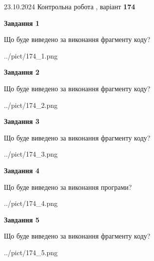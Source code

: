\documentclass[12pt, ukrainian]{article}
\begin{document}
{\Large{23.10.2024 Контрольна робота , варіант  \No \textbf { 174 }\par}}
{
\begin {large}
{\begin {center}\textbf{Завдання 1}\end {center}}

Що буде виведено за виконання фрагменту коду?\par
\begin{center}
	{../pict/174_1.png}
\end{center}
\newpage

{\begin {center}\textbf{Завдання 2}\end {center}}

Що буде виведено за виконання фрагменту коду?\par
\begin{center}
	{../pict/174_2.png}
\end{center}
\newpage

{\begin {center}\textbf{Завдання 3}\end {center}}

Що буде виведено за виконання фрагменту коду?\par
\begin{center}
	{../pict/174_3.png}
\end{center}
\newpage

{\begin {center}\textbf{Завдання 4}\end {center}}

Що буде виведено за виконання програми?\par
\begin{center}
	{../pict/174_4.png}
\end{center}
\newpage

{\begin {center}\textbf{Завдання 5}\end {center}}

Що буде виведено за виконання фрагменту коду?\par
\begin{center}
	{../pict/174_5.png}
\end{center}
\newpage


\end{large}}
\end{document}
